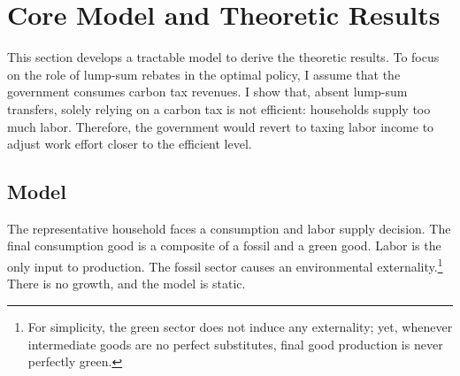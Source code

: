 \section{Core Model and Theoretic Results}\label{sec:mod_an}

This section develops a tractable model  to derive the theoretic results. To focus on the role of lump-sum rebates in the optimal policy, I assume that the government consumes carbon tax revenues. I show that, absent lump-sum transfers, solely relying on a carbon tax is not efficient: households supply too much labor. Therefore, the government would revert to taxing labor income to adjust work effort closer to the efficient level.
\subsection{Model}
The representative household faces a consumption and labor supply decision. The final consumption good is a composite of a fossil and a green good. Labor is the only input to production. The fossil sector causes an environmental externality.\footnote{ For simplicity, the green sector does not induce any externality; yet, whenever intermediate goods are no perfect substitutes, final good production is never perfectly green.} There is no growth, and the model is static.

